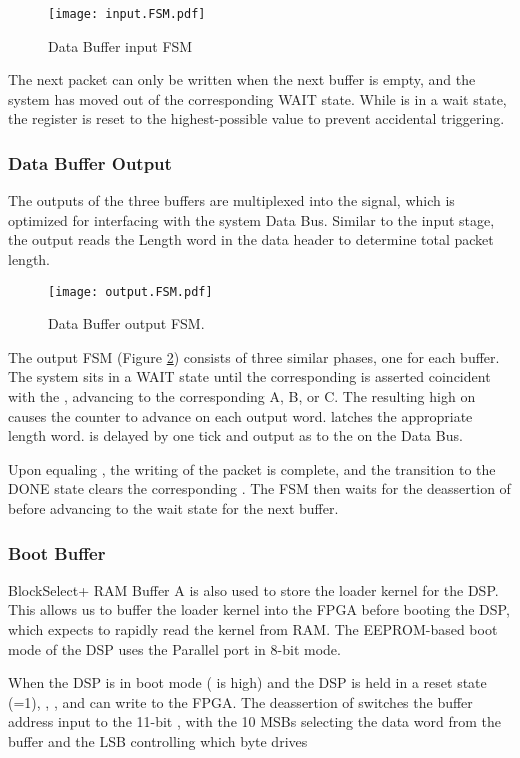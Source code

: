       
\begin{figure}
  \texttt{[image: input.FSM.pdf]}
  \caption{Data Buffer input FSM}
  \label{InputFSM}
\end{figure}

The next packet can only be written when the next buffer is empty, and
the system has moved out of the corresponding WAIT state. While
 is in a wait state, the  register is
reset to the highest-possible value to prevent accidental triggering.
      
\subsubsection{Data Buffer Output}
      
The outputs of the three buffers are multiplexed into the
 signal, which is optimized for interfacing with
the system Data Bus. Similar to the input stage, the output reads the
Length word in the data header to determine total packet length.

\begin{figure}[h]
  \texttt{[image: output.FSM.pdf]}
  \caption{Data Buffer output FSM.}
  \label{OutputFSM}
\end{figure}
The output FSM  (Figure \ref{OutputFSM}) consists of
three similar phases, one for each buffer. The system sits in a WAIT
state until the corresponding  is asserted
coincident with the , advancing to the corresponding
A, B, or C. The resulting high on  causes the
 counter to advance on each output word.
 latches the appropriate length word.
 is delayed by one tick and output as
 to the  on the Data Bus.

Upon  equaling , the writing
of the packet is complete, and the transition to the DONE state clears
the corresponding . The FSM then waits for the
deassertion of  before advancing to the wait state for
the next buffer.
   
\subsubsection{Boot Buffer}

BlockSelect+ RAM Buffer A is also used to store the loader kernel for
the DSP. This allows us to buffer the loader kernel into the FPGA
before booting the DSP, which expects to rapidly read the kernel from
RAM. The EEPROM-based boot mode of the DSP uses the Parallel port in
8-bit mode.

When the DSP is in boot mode ( is high) and the DSP is
held in a reset state (=1), ,
, and  can write to the FPGA. The
deassertion of  switches the buffer address input to
the 11-bit , with the 10 MSBs selecting the data word
from the buffer and the LSB controlling which byte drives

